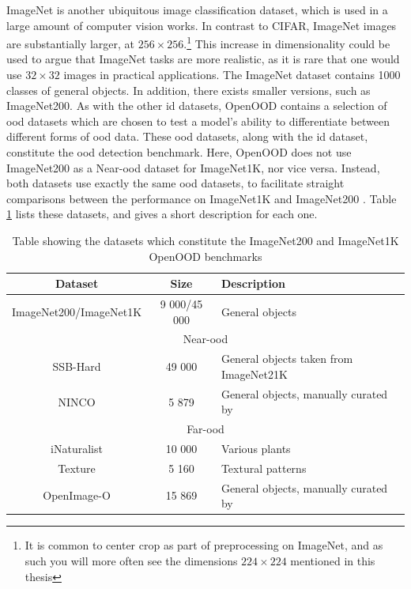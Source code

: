 \documentclass[UKenglish]{uiomasterthesis} %
\theoremstyle{definition}
\begin{document}
ImageNet is another ubiquitous image classification dataset, which is used in a large amount of computer vision works. In contrast to CIFAR, ImageNet images are substantially larger, at $256 \times 256$.\footnote{It is common to center crop as part of preprocessing on ImageNet, and as such you will more often see the dimensions $224 \times 224$ mentioned in this thesis} This increase in dimensionality could be used to argue that ImageNet tasks are more realistic, as it is rare that one would use $32 \times 32$ images in practical applications. The ImageNet dataset contains 1000 classes of general objects. In addition, there exists smaller versions, such as ImageNet200. As with the other \ac{id} datasets, OpenOOD contains a selection of \ac{ood} datasets which are chosen to test a model's ability to differentiate between different forms of \ac{ood} data. These \ac{ood} datasets, along with the \ac{id} dataset, constitute the \ac{ood} detection benchmark. Here, OpenOOD does not use ImageNet200 as a Near-\ac{ood} dataset for ImageNet1K, nor vice versa. Instead, both datasets use exactly the same \ac{ood} datasets, to facilitate straight comparisons between the performance on ImageNet1K and ImageNet200 \cite{openood15}. Table \ref{table:imagenet200} lists these datasets, and gives a short description for each one.

\begin{table}[h]
\begin{center}
\begin{tabular}{ |c|c|l| } 
    \hline
    Dataset & Size & Description \\
    \hline
    \rowcolor{id!50}
    ImageNet200/ImageNet1K & 9 000/45 000 & General objects \\ 
    \hline
    \hline
    \multicolumn{3}{|c|}{Near-\ac{ood}} \\
    \hline
    \rowcolor{near!50}
    SSB-Hard & 49 000 & General objects taken from ImageNet21K \\ 
    \rowcolor{near!50}
    NINCO & 5 879 & General objects, manually curated by \cite{bitterwolf2023ninco} \\ 
    \hline
    \hline
    \multicolumn{3}{|c|}{Far-\ac{ood}} \\
    \hline
    \rowcolor{far!50}
    iNaturalist & 10 000 & Various plants \\ 
    \rowcolor{far!50}
    Texture & 5 160 & Textural patterns \\ 
    \rowcolor{far!50}
    OpenImage-O & 15 869 & General objects, manually curated by \cite{vim} \\ 
    \hline
    \end{tabular}
    \caption[ImageNet benchmark datasets]{Table showing the datasets which constitute the ImageNet200 and ImageNet1K OpenOOD benchmarks}
    \label{table:imagenet200}
\end{center}
\end{table}
\end{document}
